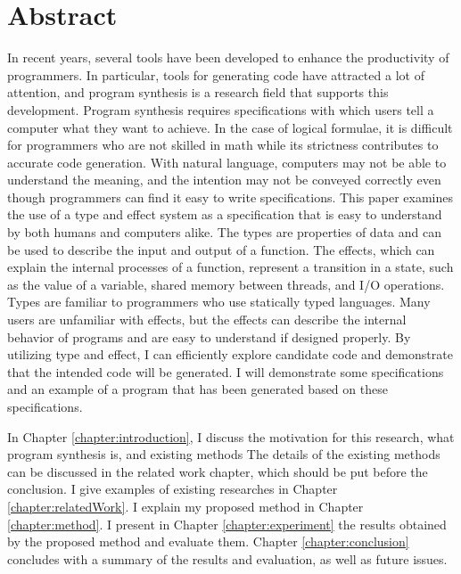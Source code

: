 \documentclass[12pt, a4paper, titlepage]{report}
\begin{document}
\chapter{Abstract} \label{chapter:abstract}
In recent years, several tools have been developed to enhance the productivity of programmers.
In particular, tools for generating code have attracted a lot of attention, and program synthesis is a research field that supports this development.
Program synthesis requires specifications with which users tell a computer what they want to achieve.
In the case of logical formulae, it is
difficult for programmers who are not skilled in math while its strictness contributes to accurate code generation.
With natural language, computers may not be able to understand the meaning, and the intention may not be conveyed correctly even though programmers can find it easy to write specifications.
This paper examines the use of a type and effect system as a specification that is easy to understand by both humans and computers alike. The types are properties of data and can be used to describe the input and output of a function. The effects, which can explain the internal processes of a function, represent a transition in a state, such as the value of a variable, shared memory between threads, and I/O operations.
Types are familiar to programmers who use statically typed languages.
Many users are unfamiliar with effects, but the effects can describe the internal behavior of programs and are easy to understand if designed properly.
By utilizing type and effect, I can efficiently explore candidate code and demonstrate that the intended code will be generated. I will demonstrate some specifications and an example of a program that has been generated based on these specifications.
 

In Chapter \ref{chapter:introduction}, I discuss the motivation for this research, what program synthesis is, and existing methods  The details of the existing methods can be discussed in the related work chapter, which should be  put before the conclusion.
I give examples of existing researches in Chapter \ref{chapter:relatedWork}.
I explain my proposed method in Chapter \ref{chapter:method}.
I present in Chapter \ref{chapter:experiment} the results obtained by the proposed method and evaluate them.
Chapter \ref{chapter:conclusion} concludes with a summary of the results and evaluation, as well as future issues.
\end{document}
